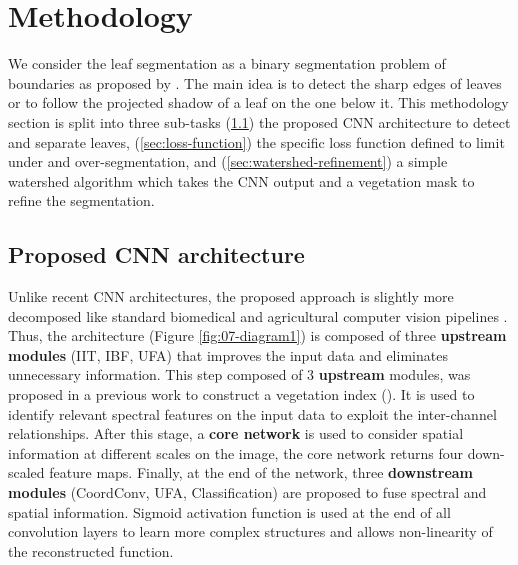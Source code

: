 \documentclass[../thesis.tex]{subfiles}
\begin{document}
    
    \section{Methodology}
    
    We consider the leaf segmentation as a binary segmentation problem of boundaries as proposed by \cite{morris2018pyramid}. The main idea is to detect the sharp edges of leaves or to follow the projected shadow of a leaf on the one below it. This methodology section is split into three sub-tasks (\ref{sec:proposed-cnn}) the proposed CNN architecture to detect and separate leaves, (\ref{sec:loss-function}) the specific loss function defined to limit under and over-segmentation, and (\ref{sec:watershed-refinement}) a simple watershed algorithm which takes the CNN output and a vegetation mask to refine the segmentation. %
    
    
    \subsection{Proposed CNN architecture}
    \label{sec:proposed-cnn}
    
    Unlike recent CNN architectures, the proposed approach is slightly more decomposed like standard biomedical and agricultural computer vision pipelines \cite{pmid29048559, 8206403}. Thus, the architecture (Figure \ref{fig:07-diagram1}) is composed of three \textbf{upstream modules} (IIT, IBF, UFA) that improves the input data and eliminates unnecessary information. This step composed of 3 \textbf{upstream} modules, was proposed in a previous work to construct a vegetation index (\cite{Vayssade2021}). It is used to identify relevant spectral features on the input data to exploit the inter-channel relationships. After this stage, a \textbf{core network} is used to consider spatial information at different scales on the image, the core network returns four down-scaled feature maps. Finally, at the end of the network, three \textbf{downstream modules} (CoordConv, UFA, Classification) are proposed to fuse spectral and spatial information. Sigmoid activation function is used at the end of all convolution layers to learn more complex structures and allows non-linearity of the reconstructed function.
    
\end{document}
